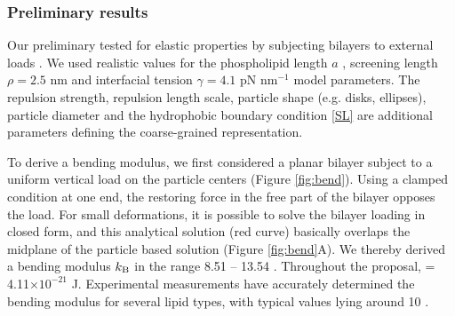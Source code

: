 

\subsubsection{Preliminary results}
Our preliminary tested for elastic properties by subjecting bilayers to external loads \cite{Fu2018_SIAM}.
We used realistic values for the phospholipid length $a$ \cite{Boal},
screening length $\rho = 2.5$ nm \cite{Eriksson1989,Lin2005,Parsegian,Israelachvili80,TerziDeserno17}
and interfacial tension $\gamma=4.1$ pN nm$^{-1}$ \cite{GarciaSaez, KUZMIN2005, Petelska2012, Jackson}
model parameters.
The repulsion strength, repulsion length scale, particle shape (e.g. disks, ellipses), 
particle diameter and the hydrophobic boundary condition \eqref{SL}
are additional parameters defining the coarse-grained representation. 

To derive a bending modulus, we first considered a planar bilayer subject to a uniform vertical load on the particle centers (Figure \ref{fig:bend}). 
Using a clamped condition at one end, the restoring force in the free part of the bilayer opposes the load.
For small deformations, it is possible to solve the bilayer loading in closed form, and 
this analytical solution (red curve) basically overlaps the midplane of the particle based solution (Figure \ref{fig:bend}A).
We thereby derived a bending modulus $k_{\mathrm{B}}$ in the range 8.51 -- 13.54 \kBT. Throughout the proposal, \kBT\; = 4.11$\times 10^{-21}$ J.
Experimental measurements have accurately determined the bending modulus for several lipid types, with 
typical values lying around 10 \kBT\; \cite{Naetal15,VeBrPa15,NAGLE2000159,PhysRevLett.113.248102}.

